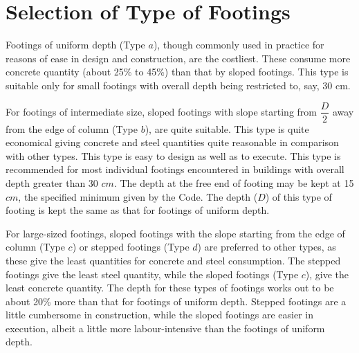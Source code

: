 \documentclass{report}
\begin{document}
\section{Selection of Type of Footings}
Footings of uniform depth (Type $a$), though commonly used in practice for reasons of ease in design and construction, are the costliest. These consume more concrete quantity (about 25\% to 45\%) than that by sloped footings. This type is suitable only for small footings with overall depth being restricted to, say, 30 cm.

For footings of intermediate size, sloped footings with slope starting from $\dfrac{D}{2}$ away from the edge of column
(Type $b$), are quite suitable. This type is quite economical giving concrete and steel quantities quite reasonable in comparison with other types. This type is easy to design as well as to execute. This type is recommended for most individual footings encountered in buildings with overall depth greater than 30 $cm$. The depth at the free end of footing may be kept at 15 $cm$, the specified minimum given by the Code. The depth ($D$) of this type of footing is kept the same as that for footings of uniform depth.

For large-sized footings, sloped footings with the slope starting from the edge of column
(Type $c$) or stepped footings (Type $d$) are preferred to other types, as these give the least quantities for concrete and steel consumption. The stepped footings give the least steel quantity, while the sloped footings (Type $c$), give the least concrete quantity. The depth for these types of footings works out to be about 20\% more than that for footings of uniform depth. Stepped footings are a little cumbersome in construction, while the sloped footings are easier in execution, albeit a little more labour-intensive than the footings of uniform depth.

\end{document}

